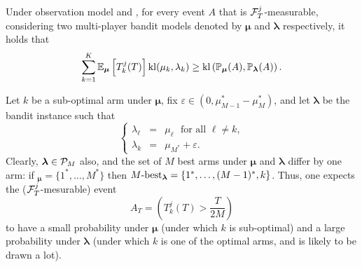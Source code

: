 \begin{lemma}\label{lem:5:CD} Under observation model \modelun{} and \modeldeux, for every event $A$ that is $\mathcal{F}_{T}^{j}$-measurable, considering two multi-player bandit models denoted by $\bm{\mu}$ and $\bm{\lambda}$ respectively, it holds that
\begin{equation}
  \sum_{k=1}^{K}\mathbb{E}_{\bm{\mu}}\left[T_k^j(T)\right]\mathrm{kl}(\mu_k,\lambda_k) \geq \mathrm{kl} \left(\mathbb{P}_{\bm{\mu}}(A),\mathbb{P}_{\bm{\lambda}}(A)\right).
\end{equation}
\end{lemma}

Let $k$ be a sub-optimal arm under $\bm{\mu}$,
fix $\varepsilon \in \left(0, \mu_{M-1}^* - \mu_M^*\right)$,
and let $\bm{\lambda}$ be the bandit instance such that
\[\left\{\begin{array}{ccl}
          \lambda_\ell & = & \mu_\ell \ \ \  \text{for all } \ell \neq k, \\
          \lambda_k & = & \mu_{M^*} + \varepsilon.
         \end{array}
\right.\]
Clearly, $\bm{\lambda}\in\mathcal{P}_M$ also,
and the set of $M$ best arms under $\bm{\mu}$ and $\bm{\lambda}$ differ by one arm: if \Mbest$_{\bm{\mu}} = \{1^*,\dots,M^*\}$ then $M\text{-}\mathrm{best}_{\bm{\lambda}} = \{1^*,\dots,(M-1)^*,k\}$.
Thus, one expects the ($\mathcal{F}^j_T$-mesurable) event
\[A_T = \left(T_k^j(T) > \frac{T}{2M}\right)\]
to have a small probability under $\bm{\mu}$ (under which $k$ is sub-optimal) and a large probability under $\bm{\lambda}$ (under which $k$ is one of the optimal arms, and is likely to be drawn a lot).


